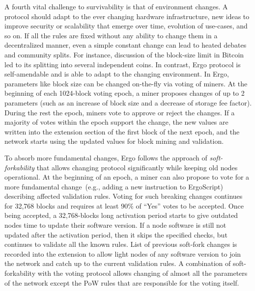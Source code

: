 A fourth vital challenge to survivability is that of environment changes. A protocol should  adapt to the ever changing hardware infrastructure, new ideas to improve security or
scalability that emerge over time, evolution of use-cases, and so on.
If all the rules are fixed without any ability to change them in a decentralized manner, even
a simple constant change can lead to heated debates and community splits. For instance,  discussion of the block-size limit in Bitcoin led to its splitting into several independent coins.
In contrast, Ergo protocol is self-amendable and is able to adapt to the changing environment.
In Ergo, parameters like block size can be changed on-the-fly via voting of miners.
At the beginning of each 1024-block voting epoch, a miner proposes changes of up to 2 parameters (such as an increase of block size and a decrease of storage fee factor). During the rest the epoch, miners vote to approve or reject the changes.
If a majority of votes within the epoch support the change, the new values are written into the extension section of the first block of the next epoch, and
the network starts using the updated values for block mining and validation.

To absorb more fundamental changes, Ergo follows the approach of {\em soft-forkability} that
allows changing protocol significantly while keeping old nodes operational.
At the beginning of an epoch, a miner can also propose to vote for a more fundamental change~(e.g., adding a new instruction to ErgoScript) describing affected validation rules.
Voting for such breaking changes continues for 32,768 blocks and requires at least $90\%$ of
``Yes'' votes to be accepted. Once being accepted, a 32,768-blocks long activation period starts to give outdated nodes time to update their software version.
If a node software is still not updated after the activation period, then it skips the specified checks, but continues to validate all the known rules.
List of previous soft-fork changes is recorded into the extension to allow light nodes of
any software version to join the network and catch up to the current validation rules.
A combination of soft-forkability with the voting protocol allows changing of almost all the parameters of the network except the PoW rules that are responsible for the voting itself.
